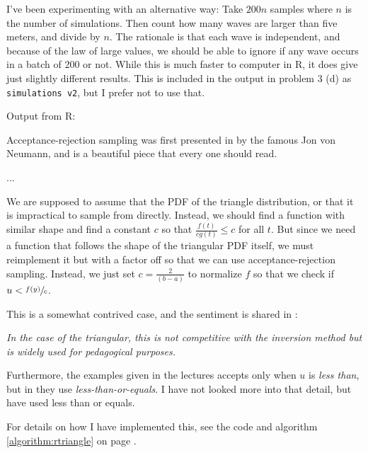 \documentclass[a4paper,english,12pt]{article}
\begin{document}
I've been experimenting with an alternative way: Take $200n$ samples where $n$
is the number of simulations. Then count how many waves are larger than five
meters, and divide by $n$. The rationale is that each wave is independent, and
because of the law of large values, we should be able to ignore if any wave
occurs in a batch of 200 or not. While this is much faster to computer in R, it
does give just slightly different results. This is included in the output in
problem 3 (d) as \texttt{simulations v2}, but I prefer not to use that.

\label{problem:3d}
Output from R:

Acceptance-rejection sampling was first presented in \cite{von1961various} by the
famous Jon von Neumann, and is a beautiful piece that every one should read.

... 

We are supposed to assume that the PDF of
the triangle distribution, or that it is impractical to sample from directly.
Instead, we should find a function with similar shape and find a constant $c$
so that $\frac{f(t)}{cg(t)} \leqslant c$ for all $t$. But since we need a
function that follows the shape of the triangular PDF itself, we must
reimplement it but with a factor off so that we can use acceptance-rejection
sampling. Instead, we just set $c=\frac{2}{(b-a)}$ to normalize $f$ so that we
check if $u < \sfrac{f(y)}{c}$.

This is a somewhat contrived case, and the sentiment is shared in
\cite{STEIN20091143}:

\textit{In the case of the triangular, this is not competitive with the
inversion method but is widely used for pedagogical purposes.}

Furthermore, the examples given in the lectures accepts only when $u$ is
\textit{less than}, but in \cite{stanford} they use
\textit{less-than-or-equals}. I have not looked more into that detail, but have
used less than or equals.

For details on how I have implemented this, see the code and algorithm
\ref{algorithm:rtriangle} on page \pageref{algorithm:rtriangle}.
\end{document}
